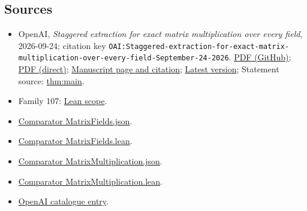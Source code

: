 \documentclass[11pt]{article}
\begin{document}
\subsection{Sources}
\begin{itemize}
\item OpenAI, \emph{Staggered extraction for exact matrix multiplication over every field}, 2026-09-24; citation key \texttt{OAI:Staggered-extraction-for-exact-matrix-multiplication-over-every-field-September-24-2026}. \href{https://github.com/openai/math/blob/adc7f1241b42e322a6451854ab7e4b4c146bf78a/preprints/Staggered-extraction-for-exact-matrix-multiplication-over-every-field-September-24-2026/Staggered-extraction-for-exact-matrix-multiplication-over-every-field-September-24-2026.pdf}{PDF (GitHub)}; \href{https://github.com/openai/math/raw/adc7f1241b42e322a6451854ab7e4b4c146bf78a/preprints/Staggered-extraction-for-exact-matrix-multiplication-over-every-field-September-24-2026/Staggered-extraction-for-exact-matrix-multiplication-over-every-field-September-24-2026.pdf}{PDF (direct)}; \href{https://github.com/openai/math/blob/adc7f1241b42e322a6451854ab7e4b4c146bf78a/preprints/Staggered-extraction-for-exact-matrix-multiplication-over-every-field-September-24-2026/README.md}{Manuscript page and citation}; \href{https://github.com/openai/math/blob/main/preprints/Staggered-extraction-for-exact-matrix-multiplication-over-every-field-September-24-2026/Staggered-extraction-for-exact-matrix-multiplication-over-every-field-September-24-2026.pdf}{Latest version}; Statement source: \href{https://github.com/openai/math/blob/adc7f1241b42e322a6451854ab7e4b4c146bf78a/preprints/Staggered-extraction-for-exact-matrix-multiplication-over-every-field-September-24-2026/build/sections/introduction.tex\#L57}{thm:main}.
\item Family 107: \href{https://github.com/openai/math/blob/adc7f1241b42e322a6451854ab7e4b4c146bf78a/lean/docs/107.md}{Lean scope}.
\item \href{https://github.com/openai/math/blob/adc7f1241b42e322a6451854ab7e4b4c146bf78a/lean/ComparatorChallenges/MatrixFields.json}{Comparator MatrixFields.json}.
\item \href{https://github.com/openai/math/blob/adc7f1241b42e322a6451854ab7e4b4c146bf78a/lean/ComparatorChallenges/MatrixFields.lean}{Comparator MatrixFields.lean}.
\item \href{https://github.com/openai/math/blob/adc7f1241b42e322a6451854ab7e4b4c146bf78a/lean/ComparatorChallenges/MatrixMultiplication.json}{Comparator MatrixMultiplication.json}.
\item \href{https://github.com/openai/math/blob/adc7f1241b42e322a6451854ab7e4b4c146bf78a/lean/ComparatorChallenges/MatrixMultiplication.lean}{Comparator MatrixMultiplication.lean}.
\item \href{https://github.com/openai/math/blob/adc7f1241b42e322a6451854ab7e4b4c146bf78a/CONTENTS.md}{OpenAI catalogue entry}.
\end{itemize}
\end{document}
